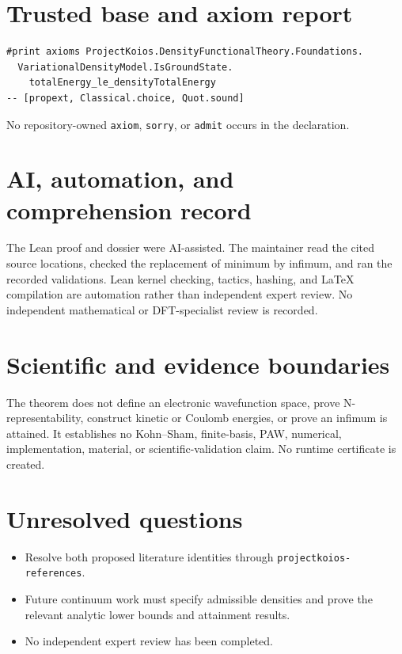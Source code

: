 \section{Trusted base and axiom report}
\begin{lstlisting}
#print axioms ProjectKoios.DensityFunctionalTheory.Foundations.
  VariationalDensityModel.IsGroundState.
    totalEnergy_le_densityTotalEnergy
-- [propext, Classical.choice, Quot.sound]
\end{lstlisting}
No repository-owned \texttt{axiom}, \texttt{sorry}, or \texttt{admit} occurs in the declaration.

\section{AI, automation, and comprehension record}
The Lean proof and dossier were AI-assisted.  The maintainer read the cited source locations,
checked the replacement of minimum by infimum, and ran the recorded validations.  Lean kernel
checking, tactics, hashing, and LaTeX compilation are automation rather than independent expert
review.  No independent mathematical or DFT-specialist review is recorded.

\section{Scientific and evidence boundaries}
The theorem does not define an electronic wavefunction space, prove N-representability, construct
kinetic or Coulomb energies, or prove an infimum is attained.  It establishes no Kohn--Sham,
finite-basis, PAW, numerical, implementation, material, or scientific-validation claim.  No
runtime certificate is created.

\section{Unresolved questions}
\begin{itemize}
\item Resolve both proposed literature identities through \texttt{projectkoios-references}.
\item Future continuum work must specify admissible densities and prove the relevant analytic lower bounds and attainment results.
\item No independent expert review has been completed.
\end{itemize}

